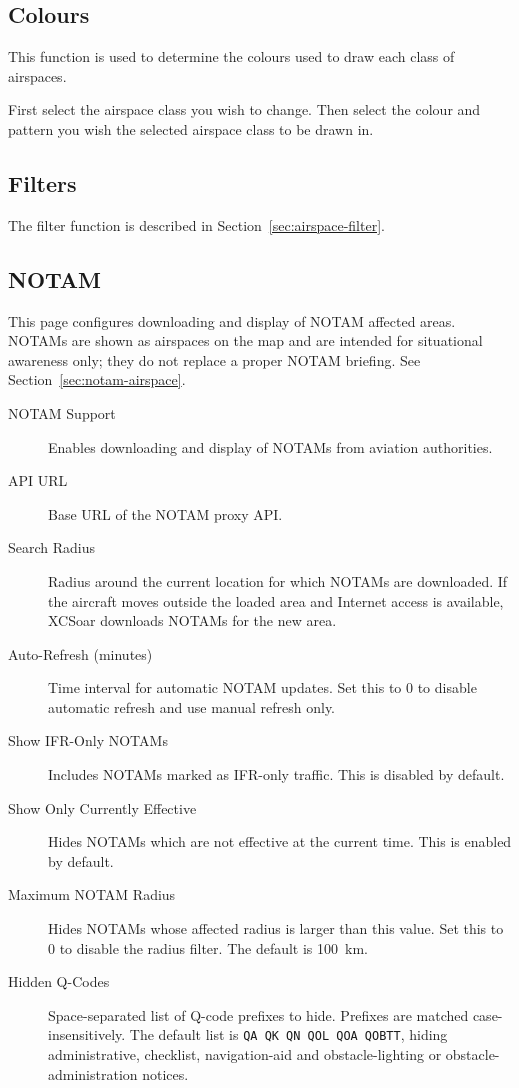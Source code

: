\subsection*{Colours}
This function is used to determine the colours used to draw each class of
airspaces.

First select the airspace class you wish to change. Then select the colour and 
pattern you wish the selected airspace class to be drawn in.

\subsection*{Filters}
The filter function is described in Section~\ref{sec:airspace-filter}.

\subsection*{NOTAM}

This page configures downloading and display of NOTAM affected areas.
NOTAMs are shown as airspaces on the map and are intended for
situational awareness only; they do not replace a proper NOTAM briefing.
See Section~\ref{sec:notam-airspace}.

\begin{description}
\item[NOTAM Support]  Enables downloading and display of NOTAMs from
  aviation authorities.
\item[API URL]  Base URL of the NOTAM proxy API.
\item[Search Radius]  Radius around the current location for which NOTAMs
  are downloaded.  If the aircraft moves outside the loaded area and
  Internet access is available, XCSoar downloads NOTAMs for the new area.
\item[Auto-Refresh (minutes)]  Time interval for automatic NOTAM updates.
  Set this to 0 to disable automatic refresh and use manual refresh only.
\item[Show IFR-Only NOTAMs]  Includes NOTAMs marked as IFR-only traffic.
  This is disabled by default.
\item[Show Only Currently Effective]  Hides NOTAMs which are not effective
  at the current time.  This is enabled by default.
\item[Maximum NOTAM Radius]  Hides NOTAMs whose affected radius is larger
  than this value.  Set this to 0 to disable the radius filter.  The
  default is 100~km.
\item[Hidden Q-Codes]  Space-separated list of Q-code prefixes to hide.
  Prefixes are matched case-insensitively.  The default list is
  \texttt{QA QK QN QOL QOA QOBTT}, hiding administrative, checklist,
  navigation-aid and obstacle-lighting or obstacle-administration notices.
\end{description}

